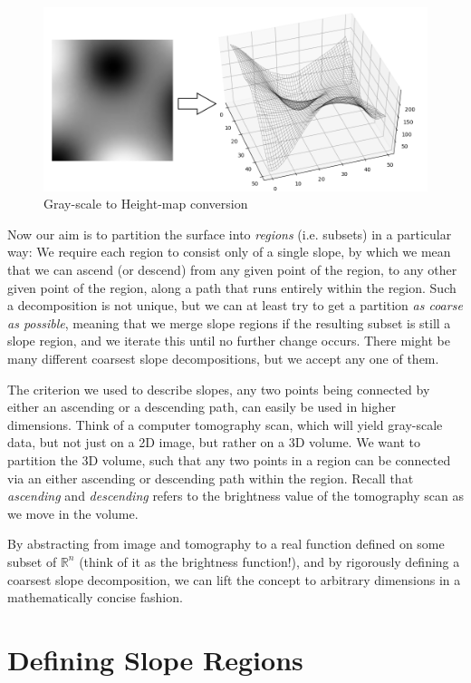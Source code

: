 \documentclass[a4paper,12pt,notitlepage,fullpage]{paper}
\theoremstyle{plain}
\theoremstyle{definition}
\begin{document}
\begin{figure}[h]
\includegraphics[width=\textwidth]{img/visu1.png}
\caption{Gray-scale to Height-map conversion}
\label{fig:conversion}
\end{figure}

Now our aim is to partition the surface into \emph{regions} (i.e. subsets) in a particular way: We require each region to consist only of a single slope, by which we mean that we can ascend (or descend) from any given point of the region, to any other given point of the region, along a path that runs entirely within the region. Such a decomposition is not unique, but we can at least try to get a partition \emph{as coarse as possible}, meaning that we merge slope regions if the resulting subset is still a slope region, and we iterate this until no further change occurs. There might be many different coarsest slope decompositions, but we accept any one of them.

The criterion we used to describe slopes, any two points being connected by either an ascending or a descending path, can easily be used in higher dimensions. Think of a computer tomography scan, which will yield gray-scale data, but not just on a 2D image, but rather on a 3D volume.
We want to partition the 3D volume, such that any two points in a region can be connected via an either ascending or descending path within the region. Recall that \emph{ascending} and \emph{descending} refers to the brightness value of the tomography scan as we move in the volume.

By abstracting from image and tomography to a real function defined on some subset of $\mathbb{R}^n$ (think of it as the brightness function!), and by rigorously defining a coarsest slope decomposition, we can lift the concept to arbitrary dimensions in a mathematically concise fashion.

\section{Defining Slope Regions}
\end{document}
